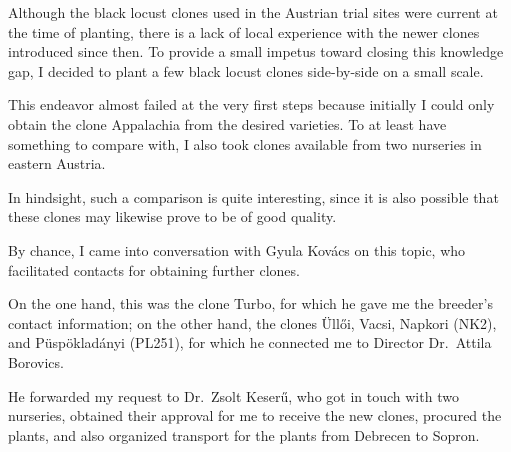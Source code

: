 
Although the black locust clones used in the Austrian trial sites were current at the time of planting, there is a lack of local experience with the newer clones introduced since then. To provide a small impetus toward closing this knowledge gap, I decided to plant a few black locust clones side-by-side on a small scale.

This endeavor almost failed at the very first steps because initially I could only obtain the clone Appalachia from the desired varieties. To at least have something to compare with, I also took clones available from two nurseries in eastern Austria.

In hindsight, such a comparison is quite interesting, since it is also possible that these clones may likewise prove to be of good quality.

By chance, I came into conversation with Gyula Kovács on this topic, who facilitated contacts for obtaining further clones.

On the one hand, this was the clone Turbo, for which he gave me the breeder's contact information; on the other hand, the clones Üllői, Vacsi, Napkori (NK2), and Püspökladányi (PL251), for which he connected me to Director Dr.~Attila Borovics.

He forwarded my request to Dr.~Zsolt Keserű, who got in touch with two nurseries, obtained their approval for me to receive the new clones, procured the plants, and also organized transport for the plants from Debrecen to Sopron.

